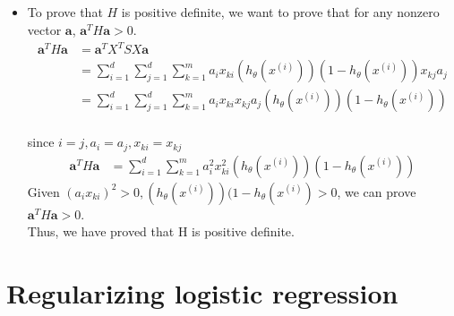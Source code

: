 \documentclass[pdftex,11pt]{article}
\begin{document}
\subsection{}
	\begin{itemize}
	\item To prove that $H$ is positive definite, we want to prove that for any nonzero vector $\textbf{a}$, $\textbf{a}^TH\textbf{a} > 0$. 
	\begin{align*}
	\textbf{a}^TH\textbf{a} &=  \textbf{a}^T X^T S X \textbf{a}\\
		&= \sum_{i = 1}^{d}\sum_{j = 1}^{d} \sum_{k = 1}^{m} a_i x_{ki}(h_{\theta}(x^{(i)}))(1 - h_{\theta}(x^{(i)})) x_{kj} a_j \\
		&= \sum_{i = 1}^{d}\sum_{j = 1}^{d} \sum_{k = 1}^{m} a_i x_{ki}x_{kj} a_j (h_{\theta}(x^{(i)}))(1 - h_{\theta}(x^{(i)})) \\
	\end{align*}	
		
	since $i = j, a_i = a_j , x_{ki} = x_{kj}$\\
	\begin{align*}
		\textbf{a}^TH\textbf{a} &= \sum_{i = 1}^{d} \sum_{k = 1}^{m} a_i^2 x_{ki}^2(h_{\theta}(x^{(i)}))(1 - h_{\theta}(x^{(i)}))            
	\end{align*}
	Given $ (a_i x_{ki} )^2 > 0, (h_{\theta}(x^{(i)}))(1 - h_{\theta}(x^{(i)}) > 0$, we can prove $\textbf{a}^TH\textbf{a} > 0$.\\
	Thus, we have proved that H is positive definite.
	\end{itemize}

\section{Regularizing logistic regression}
\end{document}
